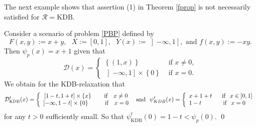 The next example shows that assertion (1) in Theorem \ref{fprop} is not necessarily satisfied for $\mathcal{R} =\mbox{KDB}$.
\begin{example}
Consider a scenario of problem \eqref{PBP} defined by
\begin{equation}
F(x,y):=x+y,\text{ \ }X:=[0,1],\text{ \ }Y(x):=\left]  -\infty,1\right]
,\text{ and \ \ }f(x,y):=-xy. \label{e1}
\end{equation}
Then $\psi_{p}(x)=x+1$ given that 
\[
\mathcal{D}(x)=\left\{
\begin{array}{ll}
\left\{ (1,x) \right\} & \text{ \ \ if \ \ }x\neq0,\\
\left]  -\infty,1\right]  \times\left\{  0\right\} & \text{ \ \  if \ \ }x=0.
\end{array}
\right.  
\]
We obtain for the KDB-relaxation that 
$$\mathcal{D}^{t}_{\text{KDB}}(x)=\left\{
\begin{array}
[c]{c}
\left[1-t,1+t\right]\times\left\{   x \right\}  \text{ \ \ \ \ \  if \ \ }x\neq0\\
\left]  -\infty,1-t\right]  \times\left\{  0\right\}  \text{ \ \ \ \ \ \ \   if \ \ }x=0
\end{array}
\right.  
\, \, \, \text{and} \,\ \, \psi_{KDB}
^{t}(x)=\left\{
\begin{array}
[c]{l}
x+1+t\text{ \ \ \ \ if } \;\,x\in\left]  0,1\right] \\
1-t\text{\ \ \ \ \ \ \ \ \ \ \ if }\;\, x=0
\end{array}
\right. $$
for any $t>0$ sufficiently small. So that $ \psi_{\text{KDB}}
^{t}(0)=1-t < \psi_{p}(0)$. \hfill \qed 
\end{example}


